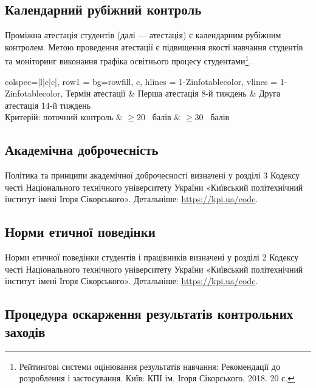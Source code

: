 \documentclass{Syllabus}
\begin{document}
\subsection*{Календарний рубіжний контроль}

Проміжна атестація студентів (далі --- атестація) є календарним рубіжним контролем. Метою проведення атестації є підвищення якості навчання студентів та моніторинг виконання графіка освітнього процесу студентами\footnote{Рейтингові системи оцінювання результатів навчання: Рекомендації до розроблення і застосування. Київ: КПІ ім. Ігоря Сікорського, 2018. 20 с.}.

\begin{center}
	\begin{tblr}{
        colspec={|l|c|c|},
      	row{1} = {bg=rowfill, c},
      	hlines = {1-Z}{infotablecolor},
      	vlines = {1-Z}{infotablecolor},
    }
		Термін атестації                    & {Перша атестація 8-й тиждень}     & {Друга атестація 14-й тиждень}     \\
		{Критерій: поточний контроль} & $\ge 20$~ балів        & $\ge 30$~ балів \\
	\end{tblr}
\end{center}

\subsection*{Академічна доброчесність}

Політика та принципи академічної доброчесності визначені у розділі 3 Кодексу честі Національного технічного університету України «Київський політехнічний інститут імені Ігоря Сікорського». Детальніше: \url{https://kpi.ua/code}.

\subsection*{Норми етичної поведінки}

Норми етичної поведінки студентів і працівників визначені у розділі 2 Кодексу честі Національного технічного університету України «Київський політехнічний інститут імені Ігоря Сікорського». Детальніше: \url{https://kpi.ua/code}.

\subsection*{Процедура оскарження результатів контрольних заходів}
\end{document}
